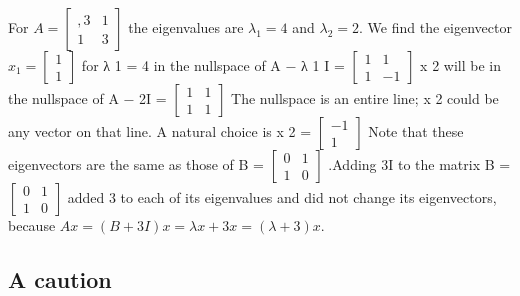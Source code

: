 \documentclass{book}
\begin{document}
For
$A =
\begin{bmatrix},  
  3 & 1 \\                                                                                
  1 & 3                                                                                   
\end{bmatrix}$                                                                        
the eigenvalues are $\lambda_1 = 4$ and $\lambda_2 = 2$. We find the eigenvector $x_1=
\begin{bmatrix}
  1\\
  1
\end{bmatrix}$
for λ 1 = 4 in the nullspace of A − λ 1 I =
$\begin{bmatrix}           
  1 & 1\\                                                 
  1 & -1                                                   
 \end{bmatrix}$                                       
x 2 will be in the nullspace of A − 2I =
$\begin{bmatrix}
  1 & 1\\
  1 & 1
 \end{bmatrix}$
The nullspace is an entire line; x 2 could be any vector on that line. A natural choice is x 2 =
$\begin{bmatrix} 
 -1\\
  1
 \end{bmatrix}$
Note that these eigenvectors are the same as those of B =
$\begin{bmatrix}
  0 & 1\\                                                                                            
  1 & 0                                                                                              
 \end{bmatrix}$                                                                                         
.Adding 3I to the matrix B =
$\begin{bmatrix}
  0 & 1\\
  1 & 0                                            
 \end{bmatrix}$
added 3 to each of its eigenvalues and did not change its eigenvectors, because
$ Ax = ( B + 3I ) x = \lambda x + 3x = ( \lambda + 3 ) x. $ 
   \subsection*{A caution}
\end{document}
